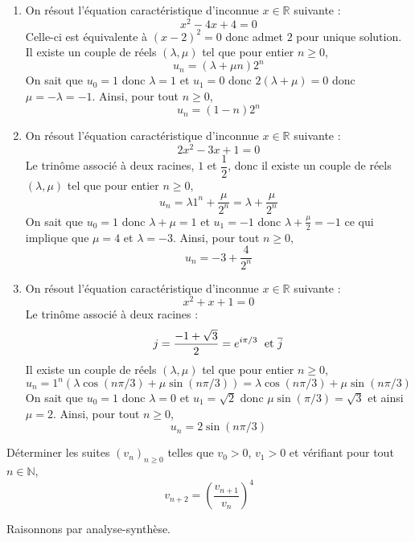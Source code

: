\documentclass[a4paper,10pt]{report}
\begin{document}
\begin{enumerate}
\item On résout l'équation caractéristique d'inconnue $x \in \mathbb{R}$ suivante :
$$ x^2-4x+4=0$$
Celle-ci est équivalente à $(x-2)^2=0$ donc admet $2$ pour unique solution. Il existe un couple de réels $(\lambda, \mu)$ tel que pour entier $n \geq 0$,
$$ u_{n} = (\lambda + \mu n) 2^n$$
On sait que $u_0= 1$ donc $\lambda=1$ et $u_1=0$ donc $2(\lambda+\mu)=0$ donc $\mu= - \lambda = -1$. Ainsi, pour tout $n \geq 0$,
$$ u_n = (1-n)2^n$$
\item On résout l'équation caractéristique d'inconnue $x \in \mathbb{R}$ suivante :
$$ 2x^2-3x+1=0$$
Le trinôme associé à deux racines, $1$ et $\dfrac{1}{2}$, donc il existe un couple de réels $(\lambda, \mu)$ tel que pour entier $n \geq 0$,
$$ u_{n} = \lambda 1^n + \dfrac{\mu}{2^n} = \lambda +\dfrac{\mu}{2^n}$$
On sait que $u_0= 1$ donc $\lambda+ \mu=1$ et $u_1=-1$ donc $\lambda+\frac{\mu}{2}=-1$ ce qui implique que $\mu=4$ et $\lambda = -3$. Ainsi, pour tout $n \geq 0$,
$$ u_n =-3 + \dfrac{4}{2^n}$$
\item On résout l'équation caractéristique d'inconnue $x \in \mathbb{R}$ suivante :
$$ x^2+x+1=0$$
Le trinôme associé à deux racines :
$$ j = \dfrac{-1+\sqrt{3}}{2} = e^{i \pi/3} \; \hbox{ et } \overline{j}$$
Il existe un couple de réels $(\lambda, \mu)$ tel que pour entier $n \geq 0$,
$$ u_{n} = 1^n (\lambda \cos(n \pi/3) + \mu \sin(n \pi/3)) = \lambda \cos(n \pi/3) + \mu \sin(n \pi/3)$$
On sait que $u_0= 1$ donc $\lambda=0$ et $u_1=\sqrt{2}$ donc $\mu \sin(\pi/3)=\sqrt{3}$ et ainsi $\mu=2$. Ainsi, pour tout $n \geq 0$,
$$ u_n = 2 \sin(n \pi/3)$$
\end{enumerate}

\medskip


\begin{Exa} Déterminer les suites $(v_n)_{n \geq 0}$ telles que $v_0>0$, $v_1>0$  et vérifiant pour tout $n \in \mathbb{N}$, 
$$v_{n+2}=\left(\dfrac{v_{n+1}}{v_n}\right)^4$$
\end{Exa}


\corr Raisonnons par analyse-synthèse. 

\medskip
\end{document}
